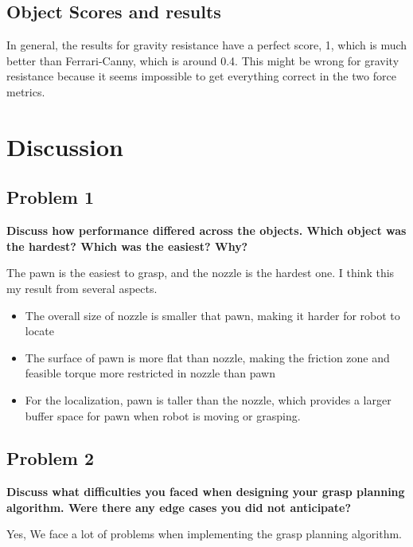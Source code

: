 \documentclass{article}
\begin{document}
\begin{multicols}{2}
\begin{center}
\begin{tabular}{ | m{1.5cm} | m{1.5cm}| m{1.5cm}| m{1.5cm}|  }
\end{tabular}  
\end{center}


\subsection{Object Scores and results}
In general, the results for gravity resistance have a perfect score, 1, which is much better than Ferrari-Canny, which is around 0.4. This might be wrong for gravity resistance because it seems impossible to get everything correct in the two force metrics. 



\section{Discussion}
\subsection{Problem 1}
\textbf{Discuss how performance differed across the objects. Which object was the hardest? Which was the easiest? Why?}

The pawn is the easiest to grasp, and the nozzle is the hardest one. I think this my result from several aspects.

\begin{itemize}
    \item The overall size of nozzle is smaller that pawn, making it harder for robot to locate
    \item The surface of pawn is more flat than nozzle, making the friction zone and feasible torque more restricted in nozzle than pawn
    \item For the localization, pawn is taller than the nozzle, which provides a larger buffer space for pawn when robot is moving or grasping.
\end{itemize}




\subsection{Problem 2}
\textbf{ Discuss what difficulties you faced when designing your grasp planning algorithm. Were there any edge cases you did not anticipate?}


Yes, We face a lot of problems when implementing the grasp planning algorithm. 


\end{multicols}
\end{document}
